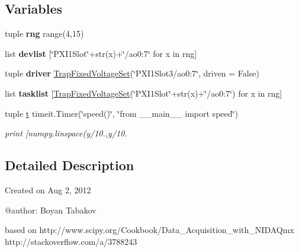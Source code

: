 \subsection*{Variables}
\begin{DoxyCompactItemize}
\item 
\hypertarget{namespaceanalog__outputs__to__josh_a34bd135fc53657b83a17cf23f1accfee}{tuple {\bfseries rng} range(4,15)}\label{namespaceanalog__outputs__to__josh_a34bd135fc53657b83a17cf23f1accfee}

\item 
\hypertarget{namespaceanalog__outputs__to__josh_a20e2440dbd6c66f0d2f7d3dfc451c9b2}{list {\bfseries devlist} \mbox{[}\char`\"{}P\-X\-I1\-Slot\char`\"{}+str(x)+\char`\"{}/ao0\-:7\char`\"{} for x in rng\mbox{]}}\label{namespaceanalog__outputs__to__josh_a20e2440dbd6c66f0d2f7d3dfc451c9b2}

\item 
\hypertarget{namespaceanalog__outputs__to__josh_ab9243288c04acb90aa9f53f7cf4f024c}{tuple {\bfseries driver} \hyperlink{classanalog__outputs__to__josh_1_1_trap_fixed_voltage_set}{Trap\-Fixed\-Voltage\-Set}(\char`\"{}P\-X\-I1\-Slot3/ao0\-:7\char`\"{}, driven = False)}\label{namespaceanalog__outputs__to__josh_ab9243288c04acb90aa9f53f7cf4f024c}

\item 
\hypertarget{namespaceanalog__outputs__to__josh_aaf1428ce34b237c8ddeea7326bbfa4ca}{list {\bfseries tasklist} \mbox{[}\hyperlink{classanalog__outputs__to__josh_1_1_trap_fixed_voltage_set}{Trap\-Fixed\-Voltage\-Set}(\char`\"{}P\-X\-I1\-Slot\char`\"{}+str(x)+\char`\"{}/ao0\-:7\char`\"{}) for x in rng\mbox{]}}\label{namespaceanalog__outputs__to__josh_aaf1428ce34b237c8ddeea7326bbfa4ca}

\item 
tuple \hyperlink{namespaceanalog__outputs__to__josh_ad465c78e048ca6ee6b2a92ca5479ec80}{t} timeit.\-Timer(\char`\"{}speed()\char`\"{}, \char`\"{}from \-\_\-\-\_\-main\-\_\-\-\_\- import speed\char`\"{})
\begin{DoxyCompactList}\small\item\em print \mbox{[}numpy.\-linspace(y/10.,y/10. \end{DoxyCompactList}\end{DoxyCompactItemize}


\subsection{Detailed Description}
\begin{DoxyVerb}Created on Aug 2, 2012

@author: Boyan Tabakov  

based on    http://www.scipy.org/Cookbook/Data_Acquisition_with_NIDAQmx
            http://stackoverflow.com/a/3788243\end{DoxyVerb}
 

